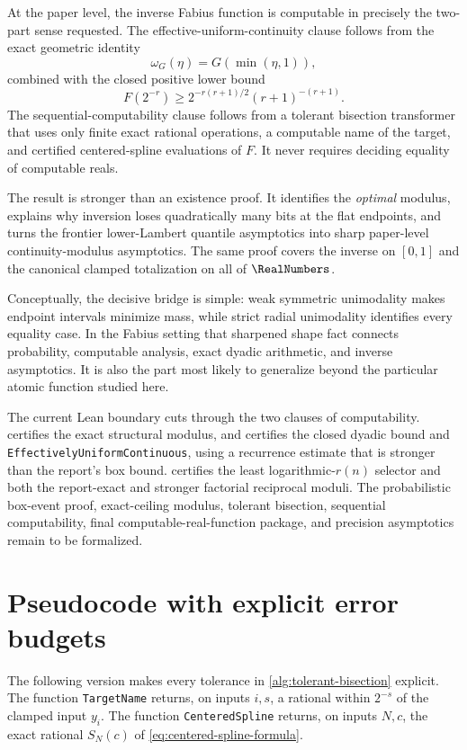 \documentclass[11pt,oneside]{article}
\theoremstyle{definition}
\theoremstyle{remark}
\numberwithin{equation}{section}
\begin{document}
At the paper level, the inverse Fabius function is computable in precisely the
two-part sense requested.  The effective-uniform-continuity clause follows
from the exact
geometric identity
\[
  \omega_G(\eta)=G(\min(\eta,1)),
\]
combined with the closed positive lower bound
\[
 F(2^{-r})\ge
 2^{-r(r+1)/2}(r+1)^{-(r+1)}.
\]
The sequential-computability clause follows from a tolerant bisection
transformer that uses only finite exact rational operations, a computable name
of the target, and certified centered-spline evaluations of $F$.  It never
requires deciding equality of computable reals.

The result is stronger than an existence proof.  It identifies the
\emph{optimal} modulus, explains why inversion loses quadratically many bits
at the flat endpoints, and turns the frontier lower-Lambert quantile
asymptotics into sharp paper-level continuity-modulus asymptotics.  The same proof covers
the inverse on $[0,1]$ and the canonical clamped totalization on all of
$\RealNumbers$.

Conceptually, the decisive bridge is simple: weak symmetric unimodality makes
endpoint intervals minimize mass, while strict radial unimodality identifies
every equality case.  In the Fabius setting that sharpened shape fact connects
probability, computable analysis, exact dyadic arithmetic, and inverse
asymptotics.  It is also the part most likely to generalize beyond the
particular atomic function studied here.

The current Lean boundary cuts through the two clauses of computability.
 certifies the exact structural modulus, and
 certifies the closed dyadic bound
and \texttt{EffectivelyUniformContinuous}, using a recurrence estimate that is
stronger than the report's box bound.
 certifies the least
logarithmic-$r(n)$ selector and both the report-exact and stronger factorial
reciprocal moduli.  The probabilistic box-event proof, exact-ceiling modulus,
tolerant bisection, sequential computability, final computable-real-function
package, and precision asymptotics remain to be formalized.

\appendix

\section{Pseudocode with explicit error budgets}
\label{app:pseudocode}

The following version makes every tolerance in
\cref{alg:tolerant-bisection} explicit.  The function
\texttt{TargetName} returns, on inputs $i,s$, a rational within $2^{-s}$ of
the clamped input $y_i$.  The function \texttt{CenteredSpline} returns, on
inputs $N,c$, the exact rational
$S_N(c)$ of \eqref{eq:centered-spline-formula}.
\end{document}
